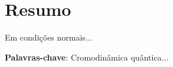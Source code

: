\chapter*{\hspace{6.2cm}Resumo}\label{chp:resumo}
\thispagestyle{headings}
\thispagestyle{empty} 

{
Em condições normais...

\textbf{Palavras-chave}: Cromodinâmica quântica...
}
